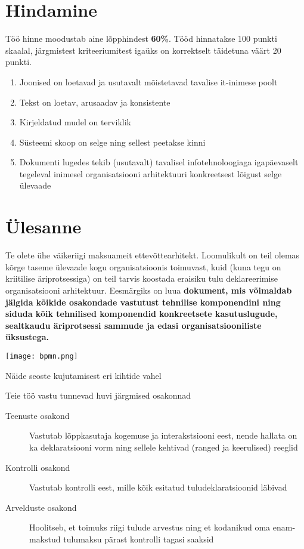 \documentclass[nobib]{tufte-handout}
\begin{document}
\section{Hindamine}
Töö hinne moodustab aine lõpphindest \textbf{60\%}. Tööd hinnatakse 100 punkti skaalal,  järgmistest kriteeriumitest igaüks on korrektselt täidetuna väärt 20 punkti.
\begin{enumerate}
	\item Joonised on loetavad ja usutavalt mõistetavad tavalise it-inimese poolt
	\item Tekst on loetav, arusaadav ja konsistente
	\item Kirjeldatud mudel on terviklik
	\item Süsteemi skoop on selge ning sellest peetakse kinni
	\item Dokumenti lugedes tekib (usutavalt) tavalisel infotehnoloogiaga igapäevaselt tegeleval inimesel organisatsiooni arhitektuuri konkreetsest lõigust selge ülevaade
\end{enumerate}

\section{Ülesanne}
Te olete ühe väikeriigi maksuameit ettevõttearhitekt. Loomulikult on teil olemas kõrge taseme ülevaade kogu organisatsioonis toimuvast, kuid (kuna tegu on kriitilise äriprotsessiga) on teil tarvis koostada eraisiku tulu deklareerimise organisatsiooni arhitektuur. Eesmärgiks on luua \textbf{dokument, mis võimaldab jälgida kõikide osakondade vastutust tehnilise komponendini ning siduda kõik tehnilised komponendid konkreetsete kasutuslugude, sealtkaudu äriprotsessi sammude ja edasi organisatsiooniliste üksustega.}
\begin{marginfigure}%
  \texttt{[image: bpmn.png]}
  \caption{Näide seoste kujutamisest eri kihtide vahel}
  \label{fig:bpmn}
\end{marginfigure}


Teie töö vastu tunnevad huvi järgmised osakonnad
\begin{description}
	\item[Teenuste osakond] Vastutab lõppkasutaja kogemuse ja interakstsiooni eest, nende hallata on ka deklaratsiooni vorm ning sellele kehtivad (ranged ja keerulised) reeglid
	\item[Kontrolli osakond] Vastutab kontrolli eest, mille kõik esitatud tuludeklaratsioonid läbivad
	\item[Arvelduste osakond] Hoolitseb, et toimuks riigi tulude arvestus ning et kodanikud oma enam-makstud tulumaksu pärast kontrolli tagasi saaksid
\end{description}
\end{document}
